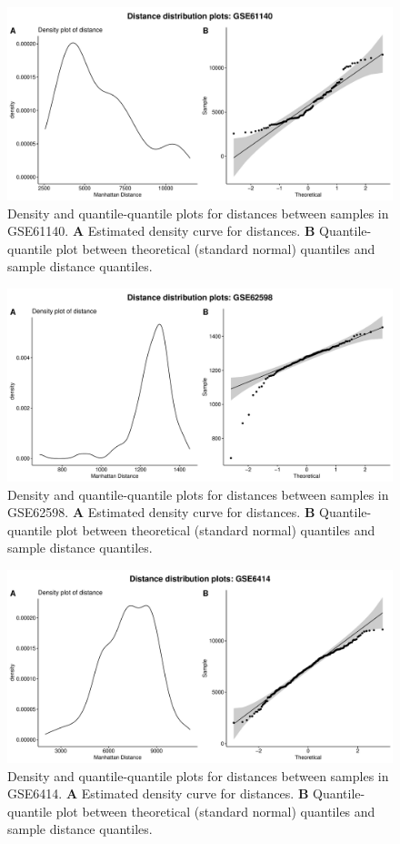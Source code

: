 \documentclass[10pt,letterpaper]{article}\usepackage[]{graphicx}\usepackage[]{color}
\begin{document}
\begin{figure}[H]
	\includegraphics[width=\textwidth]{manhattan-distance_hist_GSE61140.pdf}
	\caption{Density and quantile-quantile plots for distances between samples in GSE61140. \textbf{A} Estimated density curve for distances. \textbf{B} Quantile-quantile plot between theoretical (standard normal) quantiles and sample distance quantiles.}
\end{figure}

\begin{figure}[H]
	\includegraphics[width=\textwidth]{manhattan-distance_hist_GSE62598.pdf}
	\caption{Density and quantile-quantile plots for distances between samples in GSE62598. \textbf{A} Estimated density curve for distances. \textbf{B} Quantile-quantile plot between theoretical (standard normal) quantiles and sample distance quantiles.}
\end{figure}

\begin{figure}[H]
	\includegraphics[width=\textwidth]{manhattan-distance_hist_GSE6414.pdf}
	\caption{Density and quantile-quantile plots for distances between samples in GSE6414. \textbf{A} Estimated density curve for distances. \textbf{B} Quantile-quantile plot between theoretical (standard normal) quantiles and sample distance quantiles.}
\end{figure}
\end{document}
